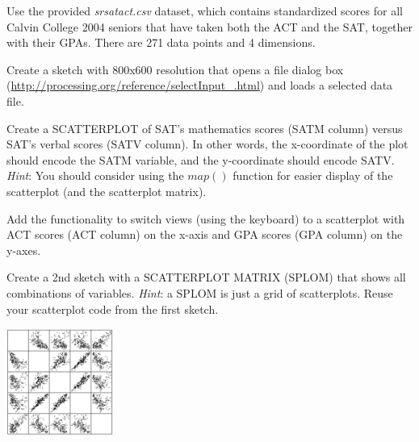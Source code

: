 \documentclass[a4paper,12pt]{article}
\begin{document}
\begin{itemize}

\item Use the provided \textit{srsatact.csv} dataset, which contains standardized scores for all Calvin College 2004 seniors that have taken both the ACT and the SAT, together with their GPAs. There are 271 data points and 4 dimensions. 

\item Create a sketch with 800x600 resolution that opens a file dialog box (\url{http://processing.org/reference/selectInput_.html}) and loads a selected data file. 

\begin{minipage}{0.71\textwidth}
\item 
Create a SCATTERPLOT of SAT's mathematics scores (SATM column) versus SAT's verbal scores (SATV column). In other words, the x-coordinate of the plot should encode the SATM variable, and the y-coordinate should encode SATV. \textit{Hint}: You should consider using the $map()$ function for easier display of the scatterplot (and the scatterplot matrix).
\end{minipage}\hspace{8pt}
\begin{minipage}{0.19\textwidth}
\end{minipage}

\item Add the functionality to switch views (using the keyboard) to a scatterplot with ACT scores (ACT column) on the x-axis and GPA scores (GPA column) on the y-axes.

\item Create a 2nd sketch with a SCATTERPLOT MATRIX (SPLOM) that shows all combinations of variables. \textit{Hint}: a SPLOM is just a grid of scatterplots. Reuse your scatterplot code from the first sketch.

\begin{center}
\includegraphics[width=3.5cm]{../images/splom.png}
\end{center}


\end{itemize}
\end{document}
